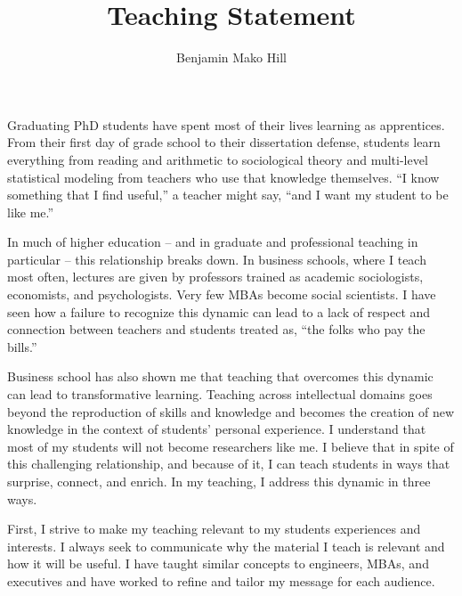 \documentclass[10pt]{memoir}
\begin{document}
\setlength{\parskip}{4.5pt}

\baselineskip 14.5pt

\title{Teaching Statement}
\author{Benjamin Mako Hill}
\date{}


\maketitle

Graduating PhD students have spent most of their lives learning as
apprentices. From their first day of grade school to their
dissertation defense, students learn everything from reading and
arithmetic to sociological theory and multi-level statistical modeling
from teachers who use that knowledge themselves.  ``I know something
that I find useful,'' a teacher might say, ``and I want my student to
be like me.''

In much of higher education -- and in graduate and professional
teaching in particular -- this relationship breaks down. In business
schools, where I teach most often, lectures are given by professors
trained as academic sociologists, economists, and psychologists. Very
few MBAs become social scientists. I have seen how a failure to
recognize this dynamic can lead to a lack of respect and connection
between teachers and students treated as, ``the folks who pay the
bills.''

Business school has also shown me that teaching that overcomes this
dynamic can lead to transformative learning. Teaching across
intellectual domains goes beyond the reproduction of skills and
knowledge and becomes the creation of new knowledge in the context of
students' personal experience. I understand that most of my students
will not become researchers like me. I believe that in spite of this
challenging relationship, and because of it, I can teach students in
ways that surprise, connect, and enrich. In my teaching, I address
this dynamic in three ways.

First, I strive to make my teaching relevant to my students
experiences and interests. I always seek to communicate why the
material I teach is relevant and how it will be useful. I have taught
similar concepts to engineers, MBAs, and executives and have worked
to refine and tailor my message for each audience.
\end{document}
